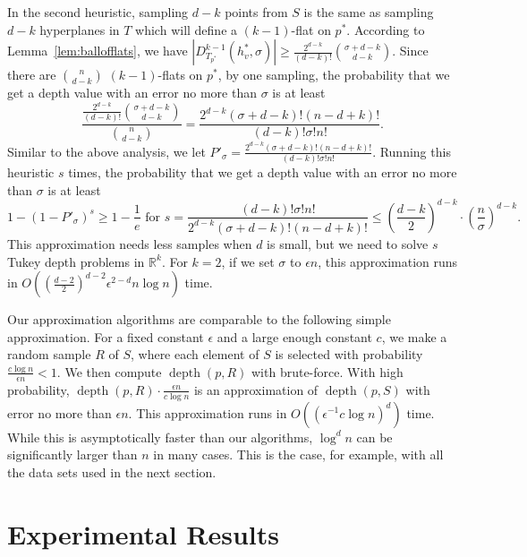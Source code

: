 \documentclass[preprint, 12pt]{elsarticle}
\DeclareMathOperator{\depth}{depth}
\begin{document}
In the second heuristic, sampling $d - k$ points from $S$ is the same as sampling $d - k$ hyperplanes in $T$ which will define a $(k-1)$-flat on $p^{*}$. According to Lemma~\ref{lem:ballofflats}, we have $|D_{T_{p^{*}}}^{k-1}(h_{v}^{*},\sigma)| \geq \frac{2^{d-k}}{(d-k)!}\binom{\sigma + d-k}{d-k}$. Since there are $\binom{n}{d-k}$ $(k-1)$-flats on $p^{*}$, by one sampling, the probability that we get a depth value with an error no more than $\sigma$ is at least
\begin{equation}
  \label{eq:prbflats}
  \frac{\frac{2^{d-k}}{(d-k)!}\binom{\sigma + d-k}{d-k}}{\binom{n}{d-k}} = \frac{2^{d-k}(\sigma+d-k)!(n-d+k)!}{(d-k)!\sigma!n!}.
\end{equation}
Similar to the above analysis, we let $P'_{\sigma} = \frac{2^{d-k}(\sigma+d-k)!(n-d+k)!}{(d-k)!\sigma!n!}$. Running this heuristic $s$ times, the probability that we get a depth value with an error no more than $\sigma$ is at least
\begin{equation}
  \label{eq:prbappr2}
  1 - (1 - P'_{\sigma})^{s} \geq 1 - \frac{1}{e} \textrm{ for } s = \frac{(d-k)!\sigma!n!}{2^{d-k}(\sigma+d-k)!(n-d+k)!} \leq \left( \frac{d-k}{2} \right)^{d-k} \cdot \left( \frac{n}{\sigma} \right)^{d-k} .
\end{equation}
This approximation needs less samples when $d$ is small, but we need to solve $s$ Tukey depth problems in $\mathbb{R}^{k}$. For $k = 2$, if we set $\sigma$ to $\epsilon n$, this approximation runs in $O\left( \left( \frac{d-2}{2} \right)^{d-2} \epsilon^{2-d} n\log n \right)$ time.

Our approximation algorithms are comparable to the following simple approximation. For a fixed constant $\epsilon$ and a large enough constant $c$, we make a random sample $R$ of $S$, where each element of $S$ is selected with probability $\frac{c\log n}{\epsilon n} < 1$. We then compute $\depth(p,R)$ with brute-force. With high probability, $\depth(p,R)\cdot \frac{\epsilon n}{c\log n}$ is an approximation of $\depth(p,S)$ with error no more than $\epsilon n$. This approximation runs in $O\left( \left( \epsilon^{-1}c\log n\right)^{d} \right)$ time. While this is asymptotically faster than our algorithms, $\log^{d} n$ can be significantly larger than $n$ in many cases. This is the case, for example, with all the data sets used in the next section.

\section{Experimental Results}
\label{sec:experi}
\end{document}
